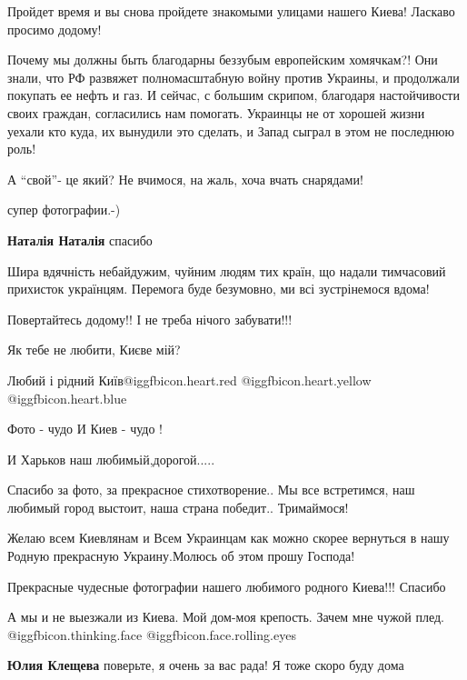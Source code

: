 \begin{itemize}
Пройдет время и вы снова пройдете знакомыми улицами нашего Киева!
Ласкаво просимо додому!


Почему мы должны быть благодарны беззубым европейским хомячкам?! Они знали, что
РФ развяжет полномасштабную войну против Украины, и продолжали покупать ее
нефть и газ. И сейчас, с большим скрипом, благодаря настойчивости своих
граждан, согласились нам помогать. Украинцы не от хорошей жизни уехали кто
куда, их вынудили это сделать, и Запад сыграл в этом не последнюю роль!

А \enquote{свой}- це який? Не вчимося, на жаль, хоча вчать снарядами!

супер фотографии.-)

\textbf{Наталія Наталія} спасибо


Шира вдячність небайдужим, чуйним людям тих країн, що надали тимчасовий прихисток
українцям. Перемога буде безумовно, ми всі зустрінемося вдома!

Повертайтесь додому!! І не треба нічого забувати!!!

Як тебе не любити, Києве мій?

Любий і рідний Київ@igg{fbicon.heart.red}
 @igg{fbicon.heart.yellow}  @igg{fbicon.heart.blue} 

Фото - чудо И Киев - чудо !

И Харьков наш любимьій,дорогой.....

Спасибо за фото, за прекрасное стихотворение.. Мы все встретимся, наш любимый город выстоит, наша страна победит.. Тримаймося!

Желаю всем Киевлянам и Всем Украинцам как можно скорее вернуться в нашу Родную прекрасную Украину.Молюсь об этом прошу Господа!

Прекрасные чудесные фотографии нашего любимого родного Киева!!! Спасибо

А мы и не выезжали из Киева. Мой дом-моя крепость. Зачем мне чужой плед. @igg{fbicon.thinking.face}  @igg{fbicon.face.rolling.eyes} 

\textbf{Юлия Клещева} поверьте, я очень за вас рада! Я тоже скоро буду дома


\end{itemize}
